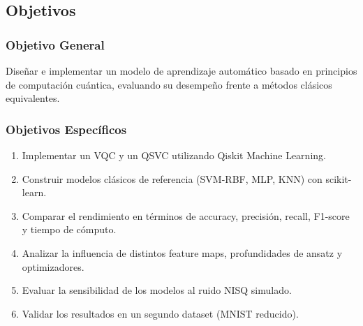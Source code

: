 \subsection{Objetivos}

\subsubsection{Objetivo General}
Dise\~nar e implementar un modelo de aprendizaje autom\'atico basado en principios de computaci\'on cu\'antica, evaluando su desempe\~no frente a m\'etodos cl\'asicos equivalentes.

\subsubsection{Objetivos Espec\'ificos}
\begin{enumerate}
    \item Implementar un VQC y un QSVC utilizando Qiskit Machine Learning.
    \item Construir modelos cl\'asicos de referencia (SVM-RBF, MLP, KNN) con scikit-learn.
    \item Comparar el rendimiento en t\'erminos de accuracy, precisi\'on, recall, F1-score y tiempo de c\'omputo.
    \item Analizar la influencia de distintos feature maps, profundidades de ansatz y optimizadores.
    \item Evaluar la sensibilidad de los modelos al ruido NISQ simulado.
    \item Validar los resultados en un segundo dataset (MNIST reducido).
\end{enumerate}
